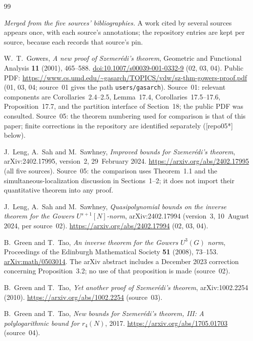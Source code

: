 \documentclass[11pt,letterpaper]{article}
\numberwithin{equation}{section}
\theoremstyle{definition}
\theoremstyle{remark}
\newcommand{\1}{\mathbf 1}
\newcommand{\file}[1]{\nolinkurl{#1}}
\begin{document}
\clearpage
\begin{thebibliography}{99}
\small
\raggedright
\item[] \emph{Merged from the five sources' bibliographies.} A work cited by several sources appears once, with each source's annotations; the repository entries are kept per source, because each records that source's pin.

W.~T.~Gowers, \emph{A new proof of Szemer\'edi's theorem}, Geometric and Functional Analysis \textbf{11} (2001), 465--588. \href{https://doi.org/10.1007/s00039-001-0332-9}{doi:10.1007/s00039-001-0332-9} (02, 03, 04). Public PDF: \url{https://www.cs.umd.edu/~gasarch/TOPICS/vdw/sz-thm-gowers-proof.pdf} (01, 03, 04; source~01 gives the path \file{users/gasarch}). Source~01: relevant components are Corollaries~2.4--2.5, Lemma~17.4, Corollaries~17.5--17.6, Proposition~17.7, and the partition interface of Section~18; the public PDF was consulted. Source~05: the theorem numbering used for comparison is that of this paper; finite corrections in the repository are identified separately ([repo05*] below).

J.~Leng, A.~Sah and M.~Sawhney, \emph{Improved bounds for Szemer\'edi's theorem}, arXiv:2402.17995, version~2, 29~February 2024. \url{https://arxiv.org/abs/2402.17995} (all five sources). Source~05: the comparison uses Theorem~1.1 and the simultaneous-localization discussion in Sections~1--2; it does not import their quantitative theorem into any proof.

J.~Leng, A.~Sah and M.~Sawhney, \emph{Quasipolynomial bounds on the inverse theorem for the Gowers $U^{s+1}[N]$-norm}, arXiv:2402.17994 (version~3, 10~August 2024, per source~02). \url{https://arxiv.org/abs/2402.17994} (02, 03, 04).

B.~Green and T.~Tao, \emph{An inverse theorem for the Gowers $U^3(G)$ norm}, Proceedings of the Edinburgh Mathematical Society \textbf{51} (2008), 73--153. \href{https://arxiv.org/abs/math/0503014}{arXiv:math/0503014}. The arXiv abstract includes a December 2023 correction concerning Proposition~3.2; no use of that proposition is made (source~02).

B.~Green and T.~Tao, \emph{Yet another proof of Szemer\'edi's theorem}, arXiv:1002.2254 (2010). \url{https://arxiv.org/abs/1002.2254} (source~03).

B.~Green and T.~Tao, \emph{New bounds for Szemer\'edi's theorem, III: A polylogarithmic bound for $r_4(N)$}, 2017. \url{https://arxiv.org/abs/1705.01703} (source~04).


\end{thebibliography}
\end{document}
